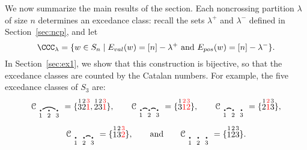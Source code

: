 \documentclass[12pt]{amsart}
\theoremstyle{definition}
\theoremstyle{remark}
\numberwithin{equation}{section}
\renewcommand{\setminus}{-}
\newcommand{\EP}{E_{pos}}
\newcommand{\EV}{E_{val}}
\begin{document}
We now summarize the main results of the section.  
Each noncrossing partition $\lambda$ of size $n$ determines an excedance class: recall the sets $\lambda^{+}$ and $\lambda^{-}$ defined in Section~\ref{sec:ncp}, and let
\[
\CCC_{\lambda} = \{ w \in S_{n} \;|\;  \text{$\EV(w) = [n] \setminus \lambda^{+}$ and $\EP(w) = [n] \setminus \lambda^{-}$}  \}.
\]
In Section~\ref{sec:ex1}, we show that this construction is bijective, so that the excedance classes are counted by the Catalan numbers.  For example, the five excedance classes of $S_{3}$ are:
\[
\mathcal{C}_{\begin{tikzpicture}[scale = 0.35, baseline = 0.35*-0.2]
\foreach \x in {1, ..., 3}{\draw[fill] (\x - 1, 0) circle (2pt) node[inner sep = 2pt] (\x) {};}
\foreach \x in {1, ..., 3}{\node[below] at (\x) {$\scriptstyle \x$};}
\foreach \i\j in {1/3}{\draw[thick] (\i) to[out = 35, in = 145] (\j);}
\end{tikzpicture}} = \{ \stackrel{1}{3}  \stackrel{2}{2} \color{red} \stackrel{3}{1} \color{black}, \stackrel{1}{2}\stackrel{2}{3} \color{red} \stackrel{3}{1} \color{black} \}, \qquad
\mathcal{C}_{\begin{tikzpicture}[scale = 0.35, baseline = 0.35*-0.2]
\foreach \x in {1, ..., 3}{\draw[fill] (\x - 1, 0) circle (2pt) node[inner sep = 2pt] (\x) {};}
\foreach \x in {1, ..., 3}{\node[below] at (\x) {$\scriptstyle \x$};}
\foreach \i\j in {1/2, 2/3}{\draw[thick] (\i) to[out = 35, in = 145] (\j);}
\end{tikzpicture}} = \{ \stackrel{1}{3} \color{red} \stackrel{2}{1} \stackrel{3}{2}  \color{black} \}, \qquad
\mathcal{C}_{\begin{tikzpicture}[scale = 0.35, baseline = 0.35*-0.2]
\foreach \x in {1, ..., 3}{\draw[fill] (\x - 1, 0) circle (2pt) node[inner sep = 2pt] (\x) {};}
\foreach \x in {1, ..., 3}{\node[below] at (\x) {$\scriptstyle \x$};}
\foreach \i\j in {1/2}{\draw[thick] (\i) to[out = 35, in = 145] (\j);}
\end{tikzpicture}} = \{\stackrel{1}{2}  \color{red} \stackrel{2}{1} \color{black}  \stackrel{3}{3}\}, 
\]
\[
\mathcal{C}_{\begin{tikzpicture}[scale = 0.35, baseline = 0.35*-0.2]
\foreach \x in {1, ..., 3}{\draw[fill] (\x - 1, 0) circle (2pt) node[inner sep = 2pt] (\x) {};}
\foreach \x in {1, ..., 3}{\node[below] at (\x) {$\scriptstyle \x$};}
\foreach \i\j in {2/3}{\draw[thick] (\i) to[out = 35, in = 145] (\j);}
\end{tikzpicture}} = \{\stackrel{1}{1} \stackrel{2}{3}  \color{red} \stackrel{3}{2} \color{black} \}, \qquad\text{and}\qquad
\mathcal{C}_{\begin{tikzpicture}[scale = 0.35, baseline = 0.35*-0.2]
\foreach \x in {1, ..., 3}{\draw[fill] (\x - 1, 0) circle (2pt) node[inner sep = 2pt] (\x) {};}
\foreach \x in {1, ..., 3}{\node[below] at (\x) {$\scriptstyle \x$};}
\end{tikzpicture}} = \{\stackrel{1}{1} \stackrel{2}{2} \stackrel{3}{3} \}.
\]
\end{document}
